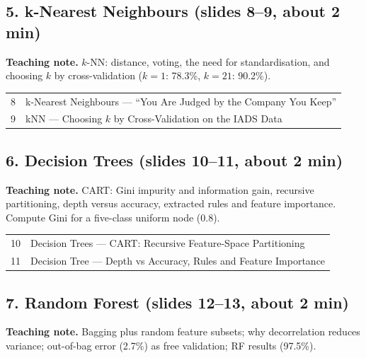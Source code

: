 \documentclass[11pt]{article}
\begin{document}
\subsection{5. k-Nearest Neighbours \normalfont\small\color{GreyN}(slides 8--9, about 2 min)}

\textbf{Teaching note.} $k$-NN: distance, voting, the need for standardisation, and choosing $k$ by cross-validation ($k=1$: 78.3\%, $k=21$: 90.2\%).

\begin{center}\small\renewcommand{\arraystretch}{1.1}\begin{tabularx}{\textwidth}{@{}r X@{}}8 & k-Nearest Neighbours --- ``You Are Judged by the Company You Keep''\\
9 & kNN --- Choosing $k$ by Cross-Validation on the IADS Data\\\end{tabularx}\end{center}

\subsection{6. Decision Trees \normalfont\small\color{GreyN}(slides 10--11, about 2 min)}

\textbf{Teaching note.} CART: Gini impurity and information gain, recursive partitioning, depth versus accuracy, extracted rules and feature importance. Compute Gini for a five-class uniform node (0.8).

\begin{center}\small\renewcommand{\arraystretch}{1.1}\begin{tabularx}{\textwidth}{@{}r X@{}}10 & Decision Trees --- CART: Recursive Feature-Space Partitioning\\
11 & Decision Tree --- Depth vs Accuracy, Rules and Feature Importance\\\end{tabularx}\end{center}

\subsection{7. Random Forest \normalfont\small\color{GreyN}(slides 12--13, about 2 min)}

\textbf{Teaching note.} Bagging plus random feature subsets; why decorrelation reduces variance; out-of-bag error (2.7\%) as free validation; RF results (97.5\%).
\end{document}
